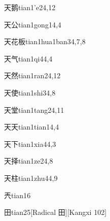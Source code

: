 \begin{entry}{天鹅}{tian1'e2}{4,12}
\end{entry}

\begin{entry}{天公}{tian1gong1}{4,4}
\end{entry}

\begin{entry}{天花板}{tian1hua1ban3}{4,7,8}
\end{entry}

\begin{entry}{天气}{tian1qi4}{4,4}
\end{entry}

\begin{entry}{天然}{tian1ran2}{4,12}
\end{entry}

\begin{entry}{天使}{tian1shi3}{4,8}
\end{entry}

\begin{entry}{天堂}{tian1tang2}{4,11}
\end{entry}

\begin{entry}{天天}{tian1tian1}{4,4}
\end{entry}

\begin{entry}{天下}{tian1xia4}{4,3}
\end{entry}

\begin{entry}{天择}{tian1ze2}{4,8}
\end{entry}

\begin{entry}{天柱}{tian1zhu4}{4,9}
\end{entry}

\begin{entry}{兲}{tian1}{6}
\end{entry}

\begin{entry}{田}{tian2}{5}[Radical 田][Kangxi 102]
\end{entry}

